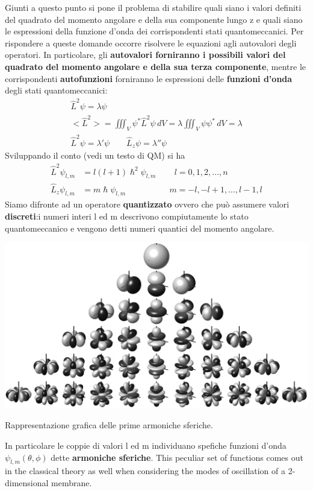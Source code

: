 Giunti a questo punto si pone il problema di stabilire quali siano i
valori definiti del quadrato del momento angolare e della sua componente
lungo z e quali siano le espressioni della funzione d'onda dei
corrispondenti stati quantomeccanici.
Per rispondere a queste domande
occorre risolvere le equazioni agli autovalori degli operatori.
In
particolare, gli \textbf{autovalori forniranno i possibili valori del
	quadrato del momento angolare e della sua terza componente}, mentre le
corrispondenti \textbf{autofunzioni} forniranno le espressioni delle
\textbf{funzioni d'onda} degli stati quantomeccanici: \begin{gather*}
	\hat{L}^{2}\psi = \lambda \psi\\
	< \hat{L}^{2}> = \iiint_{V} \psi^{*} \hat{L}^{2}\psi \, dV = \lambda \iiint_{V} \psi \psi^{*} \, dV = \lambda\\
	\hat{L}^{2} \psi = \lambda' \psi \qquad  \hat{L}_{z} \psi = \lambda'' \psi
\end{gather*}
Sviluppando il conto (vedi un testo di QM) si ha
\begin{align*}
	\hat{L}^{2}\psi_{l,m} &= l(l+1) \hslash^{2} \psi_{l,m} \qquad  \, l = 0,1,2, \dots , n\\
	\hat{L}_{z} \psi_{l,m} &= m \hslash \psi_{l,m} \qquad  \qquad \quad \, m = -l,-l + 1, \dots ,l-1, l
\end{align*} Siamo difronte ad un operatore \textbf{quantizzato} ovvero che può
assumere valori \textbf{discreti}:i numeri interi l ed m descrivono
compiutamente lo stato quantomeccanico e vengono detti numeri quantici
del momento angolare.\\
\begin{marginfigure}
	\includegraphics{figs/spherical-harmonics}
	\caption{Rappresentazione grafica delle prime armoniche sferiche.}
	\label{fig:spherical-harmonics}
\end{marginfigure}
In particolare le coppie di valori l ed m individuano spefiche funzioni
d'onda \(\psi_{l,m}(\theta,\phi)\) dette \textbf{armoniche sferiche}.
This peculiar set of functions comes out in the classical theory as well
when considering the modes of oscillation of a 2-dimensional membrane.

